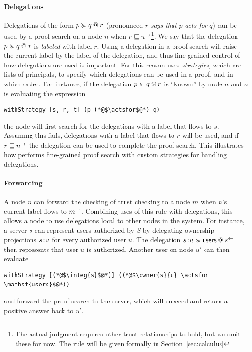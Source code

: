 \paragraph{Delegations}
Delegations of the form $\lb{r}{p \actsfor q}$ (pronounced $r$ \emph{says that} $p$ \emph{acts for} $q$) can be used by a proof search on a node $n$ when $r \flowsto \conf{n}$\footnote{The actual judgment requires other trust relationships to hold, but we omit these for now. The rule will be given formally in Section~\ref{sec:calculus}}. We say that the delegation $\lb{r}{p \actsfor q}$ is \emph{labeled} with label $r$. Using a delegation in a proof search will raise the current label by the label of the delegation, and thus fine-grained control of how delegations are used is important. For this reason \lang{} uses \emph{strategies}, which are lists of principals, to specify which delegations can be used in a proof, and in which order. For instance, if the delegation $\lb{r}{p \actsfor q}$ is ``known'' by node $n$ and $n$ is evaluating the expression
\begin{lstlisting}
withStrategy [s, r, t] (p (*@$\actsfor$@*) q)
\end{lstlisting}
the node will first search for the delegations with a label that flows to $s$. Assuming this fails, delegations with a label that flows to $r$ will be used, and if $r \flowsto \conf{n}$ the delegation can be used to complete the proof search. This illustrates how \lang{} performs fine-grained proof search with custom strategies for handling delegations.

\paragraph{Forwarding}
A node $n$ can forward the checking of trust checking to a node $m$ when $n$'s current label flows to $\conf{m}$. Combining uses of this rule with delegations, this allows a node to use delegations local to other nodes in the system. For instance, a server $s$ can represent users authorized by $S$ by delegating ownership projections $\owner{s}{u}$ for every authorized user $u$. The delegation $\lb{\integ{s}}{\owner{s}{u} \actsfor \mathsf{users}}$ then represents that user $u$ is authorized. Another user on node $u'$ can then evaluate
\begin{lstlisting}
withStrategy [(*@$\integ{s}$@*)] ((*@$\owner{s}{u} \actsfor \mathsf{users}$@*))
\end{lstlisting}
and forward the proof search to the server, which will succeed and return a positive answer back to $u'$.